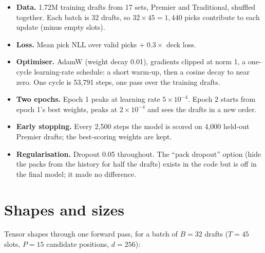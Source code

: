 \documentclass[11pt,letterpaper]{article}
\begin{document}
\begin{itemize}
\item \textbf{Data.} 1.72M training drafts from 17 sets, Premier and Traditional, shuffled together. Each
batch is 32 drafts, so $32\times45 = 1{,}440$ picks contribute to each update (minus empty slots).
\item \textbf{Loss.} Mean pick NLL over valid picks $+\;0.3\times$ deck loss.
\item \textbf{Optimiser.} AdamW (weight decay 0.01), gradients clipped at norm 1, a one-cycle learning-rate
schedule: a short warm-up, then a cosine decay to near zero. One cycle is 53,791 steps, one pass over the
training drafts.
\item \textbf{Two epochs.} Epoch 1 peaks at learning rate $5\times10^{-4}$. Epoch 2 starts from epoch 1's
best weights, peaks at $2\times10^{-4}$ and sees the drafts in a new order.
\item \textbf{Early stopping.} Every 2,500 steps the model is scored on 4,000 held-out Premier drafts;
the best-scoring weights are kept.
\item \textbf{Regularisation.} Dropout 0.05 throughout. The ``pack dropout'' option (hide the packs from
the history for half the drafts) exists in the code but is off in the final model; it made no difference.
\end{itemize}

\section{Shapes and sizes}

Tensor shapes through one forward pass, for a batch of $B=32$ drafts ($T=45$ slots, $P=15$ candidate
positions, $d=256$):
\end{document}
